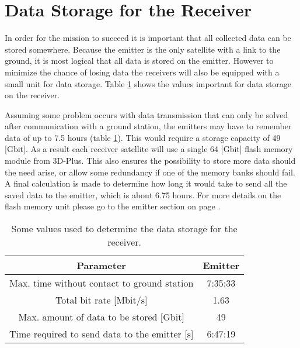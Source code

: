 \section{Data Storage for the Receiver}
\label{DSReceiver}

In order for the mission to succeed it is important that all collected data can be stored somewhere. Because the emitter is the only satellite with a link to the ground, it is most logical that all data is stored on the emitter. However to minimize the chance of losing data the receivers will also be equipped with a small unit for data storage. Table \ref{DSReceiverTable} shows the values important for data storage on the receiver. 

Assuming some problem occurs with data transmission that can only be solved after communication with a ground station, the emitters may have to remember data of up to 7.5 hours (table \ref{DSReceiverTable}). This would require a storage capacity of 49 [Gbit]. As a result each receiver satellite will use a single 64 [Gbit] flash memory module from 3D-Plus. This also ensures the possibility to store more data should the need arise, or allow some redundancy if one of the memory banks should fail. A final calculation is made to determine how long it would take to send all the saved data to the emitter, which is about 6.75 hours. For more details on the flash memory unit please go to the emitter section on page \pageref{DSEmitter}.

\begin{table}
\centering
\begin{tabular}{c|c}
\textbf{Parameter}  & \textbf{Emitter} \\\hline\hline
	Max. time without contact to ground station & 7:35:33 \\
	Total bit rate [Mbit/s] & 1.63 \\
	Max. amount of data to be stored [Gbit] & 49 \\
	Time required to send data to the emitter [s] & 6:47:19 \\
\end{tabular}
\caption{Some values used to determine the data storage for the receiver.}
\label{DSReceiverTable}
\end{table}